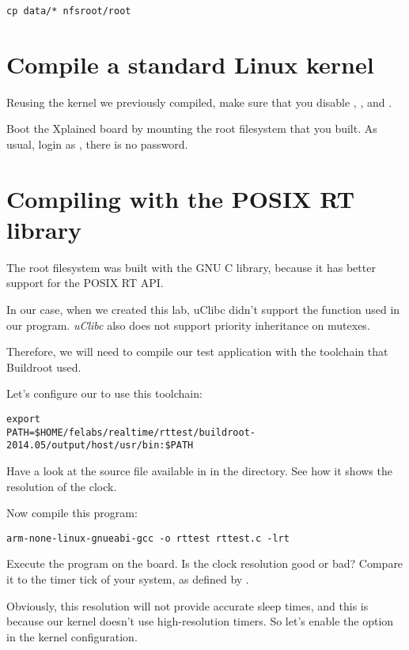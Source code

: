 \begin{verbatim}
cp data/* nfsroot/root
\end{verbatim}

\section{Compile a standard Linux kernel}

Reusing the kernel we previously compiled, make sure that you disable
, ,
 and .

Boot the Xplained board by mounting the root filesystem that you
built. As usual, login as , there is no password.

\section{Compiling with the POSIX RT library}

The root filesystem was built with the GNU C library, because it has
better support for the POSIX RT API.

In our case, when we created this lab, uClibc didn't support the
 function used in our 
program. {\em uClibc} also does not support priority inheritance on
mutexes.

Therefore, we will need to compile our test application with the
toolchain that Buildroot used.

Let's configure our  to use this toolchain:

\begin{verbatim}
export
PATH=$HOME/felabs/realtime/rttest/buildroot-2014.05/output/host/usr/bin:$PATH
\end{verbatim}

Have a look at the  source file available in
 in the  directory. See how it shows the
resolution of the  clock.

Now compile this program:
\begin{verbatim}
arm-none-linux-gnueabi-gcc -o rttest rttest.c -lrt
\end{verbatim}

Execute the program on the board. Is the clock resolution good or bad?
Compare it to the timer tick of your system, as defined by
.

Obviously, this resolution will not provide accurate sleep times, and
this is because our kernel doesn't use high-resolution timers. So
let's enable the  option in the kernel
configuration.

